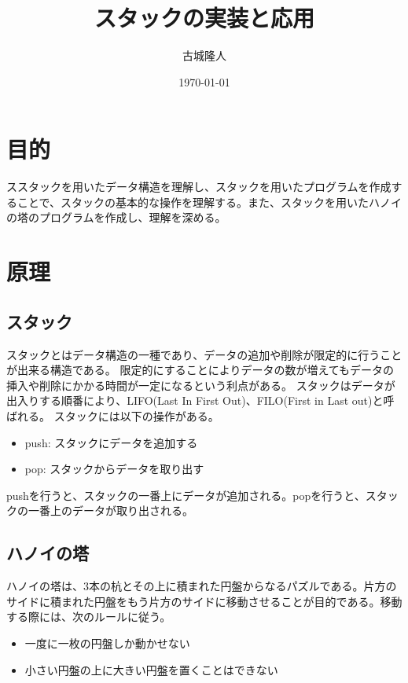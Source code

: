 \documentclass[a4paper,11pt]{jsarticle}
\begin{document}
\title{スタックの実装と応用}
\author{古城隆人}
\date{\today}
\maketitle

\tableofcontents

\newpage


\section{目的}
ススタックを用いたデータ構造を理解し、スタックを用いたプログラムを作成することで、スタックの基本的な操作を理解する。また、スタックを用いたハノイの塔のプログラムを作成し、理解を深める。
\section{原理}
\subsection{スタック}
スタックとはデータ構造の一種であり、データの追加や削除が限定的に行うことが出来る構造である。
限定的にすることによりデータの数が増えてもデータの挿入や削除にかかる時間が一定になるという利点がある。
スタックはデータが出入りする順番により、LIFO(Last In First Out)、FILO(First in Last out)と呼ばれる。
スタックには以下の操作がある。
\begin{itemize}
  \item push: スタックにデータを追加する
  \item pop: スタックからデータを取り出す
\end{itemize}
pushを行うと、スタックの一番上にデータが追加される。popを行うと、スタックの一番上のデータが取り出される。
\subsection{ハノイの塔}
ハノイの塔は、3本の杭とその上に積まれた円盤からなるパズルである。片方のサイドに積まれた円盤をもう片方のサイドに移動させることが目的である。移動する際には、次のルールに従う。
\begin{itemize}
  \item 一度に一枚の円盤しか動かせない
  \item 小さい円盤の上に大きい円盤を置くことはできない
\end{itemize}
\end{document}
